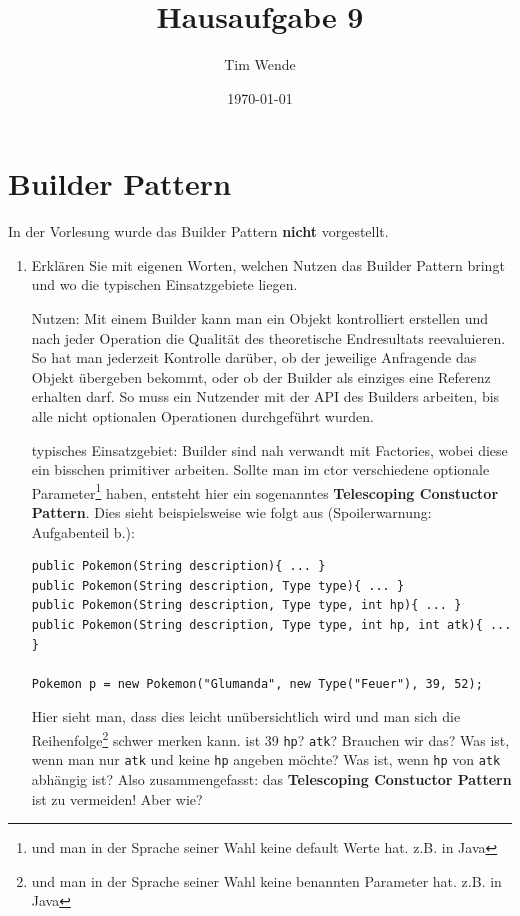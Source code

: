 \documentclass{article}
\author{Tim Wende}
\date{\today}
\title{\textbf{Hausaufgabe 9}}
\begin{document}
    \maketitle

    \newpage
    \section*{Builder Pattern}
    In der Vorlesung wurde das Builder Pattern \textbf{nicht} vorgestellt.

    \begin{enumerate}[label=\alph*.]
        \item Erklären Sie mit eigenen Worten, welchen Nutzen das Builder Pattern bringt und wo die typischen Einsatzgebiete liegen.
        
            Nutzen:
            Mit einem Builder kann man ein Objekt kontrolliert erstellen und nach jeder Operation die Qualität des theoretische Endresultats reevaluieren.
            So hat man jederzeit Kontrolle darüber, ob der jeweilige Anfragende das Objekt übergeben bekommt, oder ob der Builder als einziges eine Referenz erhalten darf.
            So muss ein Nutzender mit der API des Builders arbeiten, bis alle nicht optionalen Operationen durchgeführt wurden.
        
            typisches Einsatzgebiet:
            Builder sind nah verwandt mit Factories, wobei diese ein bisschen primitiver arbeiten.
            Sollte man im ctor verschiedene optionale Parameter\footnote{und man in der Sprache seiner Wahl keine default Werte hat. z.B. in Java} haben, entsteht hier ein sogenanntes \textbf{Telescoping Constuctor Pattern}.
            Dies sieht beispielsweise wie folgt aus (Spoilerwarnung: Aufgabenteil b.):

            \begin{verbatim}
public Pokemon(String description){ ... }
public Pokemon(String description, Type type){ ... }
public Pokemon(String description, Type type, int hp){ ... }
public Pokemon(String description, Type type, int hp, int atk){ ... }

Pokemon p = new Pokemon("Glumanda", new Type("Feuer"), 39, 52);
            \end{verbatim}

            Hier sieht man, dass dies leicht unübersichtlich wird und man sich die Reihenfolge\footnote{und man in der Sprache seiner Wahl keine benannten Parameter hat. z.B. in Java} schwer merken kann.
            ist 39 \texttt{hp}? \texttt{atk}?
            Brauchen wir das?
            Was ist, wenn man nur \texttt{atk} und keine \texttt{hp} angeben möchte?
            Was ist, wenn \texttt{hp} von \texttt{atk} abhängig ist?
            Also zusammengefasst: das \textbf{Telescoping Constuctor Pattern} ist zu vermeiden!
            Aber wie?


\end{enumerate}
\end{document}
